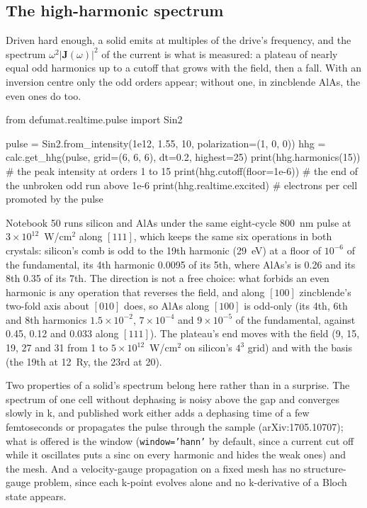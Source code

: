 \documentclass[11pt,a4paper]{article}
\newcommand{\code}[1]{\texttt{\small #1}}
\begin{document}
\subsection{The high-harmonic spectrum}

Driven hard enough, a solid emits at multiples of the drive's frequency, and the
spectrum $\omega^2|\mathbf J(\omega)|^2$ of the current is what is measured:
a plateau of nearly equal odd harmonics up to a cutoff that grows with the field,
then a fall. With an inversion centre only the odd orders appear; without one,
in zincblende AlAs, the even ones do too.

\begin{pycode}
from defumat.realtime.pulse import Sin2

pulse = Sin2.from_intensity(1e12, 1.55, 10, polarization=(1, 0, 0))
hhg = calc.get_hhg(pulse, grid=(6, 6, 6), dt=0.2, highest=25)
print(hhg.harmonics(15))          # the peak intensity at orders 1 to 15
print(hhg.cutoff(floor=1e-6))     # the end of the unbroken odd run above 1e-6
print(hhg.realtime.excited)       # electrons per cell promoted by the pulse
\end{pycode}

Notebook 50 runs silicon and AlAs under the same eight-cycle 800~nm pulse at
$3\times10^{12}$~W/cm$^2$ along $[111]$, which keeps the same six operations in both
crystals: silicon's comb is odd to the 19th harmonic (29~eV) at a floor of
$10^{-6}$ of the fundamental, its 4th harmonic 0.0095 of its 5th, where AlAs's is
0.26 and its 8th 0.35 of its 7th. The direction is not a free choice: what forbids
an even harmonic is any operation that reverses the field, and along $[100]$
zincblende's two-fold axis about $[010]$ does, so AlAs along $[100]$ is odd-only
(its 4th, 6th and 8th harmonics $1.5\times10^{-2}$, $7\times10^{-4}$ and
$9\times10^{-5}$ of the fundamental, against 0.45, 0.12 and 0.033 along $[111]$).
The plateau's end moves with the field (9, 15, 19, 27 and 31 from 1 to
$5\times10^{12}$~W/cm$^2$ on silicon's $4^3$ grid) and with the basis (the 19th at
12~Ry, the 23rd at 20).

Two properties of a solid's spectrum belong here rather than in a surprise. The
spectrum of one cell without dephasing is noisy above the gap and converges
slowly in k, and published work either adds a dephasing time of a few
femtoseconds or propagates the pulse through the sample (arXiv:1705.10707); what
is offered is the window (\code{window='hann'} by default, since a current cut
off while it oscillates puts a sinc on every harmonic and hides the weak ones)
and the mesh. And a velocity-gauge propagation on a fixed mesh has no
structure-gauge problem, since each k-point evolves alone and no k-derivative of
a Bloch state appears.
\end{document}
